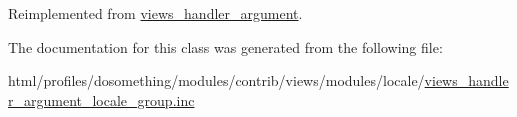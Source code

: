 Reimplemented from \hyperlink{classviews__handler__argument_a76181ac24e7be4a09aaafc1fa5f15ea1}{views\_\-handler\_\-argument}.

The documentation for this class was generated from the following file:\begin{DoxyCompactItemize}
\item 
html/profiles/dosomething/modules/contrib/views/modules/locale/\hyperlink{views__handler__argument__locale__group_8inc}{views\_\-handler\_\-argument\_\-locale\_\-group.inc}\end{DoxyCompactItemize}
